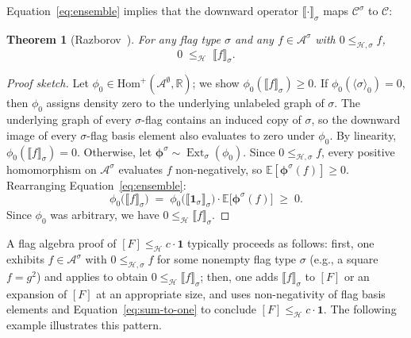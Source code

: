 \documentclass{article}
\newtheorem{theorem}{Theorem}[section]
\newcommand{\poshom}[1]{\mathrm{Hom}^+(\mathcal{A}^{#1}, \mathbb{R})}
\newcommand{\Ext}{\operatorname{Ext}}
\begin{document}
Equation~\eqref{eq:ensemble} implies that the downward operator $\llbracket \cdot \rrbracket_\sigma$ maps $\mathcal{C}^\sigma$ to $\mathcal{C}$:

\begin{theorem}[Razborov~{\cite{razborov2007flag}}]\label{thm:downward-nonneg}
  For any flag type $\sigma$ and any $f \in \mathcal{A}^\sigma$ with $0 \leq_{\mathcal{H},\sigma} f$,
  \[
    0 \;\leq_{\mathcal{H}}\; \llbracket f \rrbracket_\sigma.
  \]
\end{theorem}
\begin{proof}[Proof sketch]
  Let $\phi_0 \in \poshom{\emptyset}$; we show $\phi_0(\llbracket f \rrbracket_\sigma) \geq 0$.
  If $\phi_0(\langle\sigma\rangle_0) = 0$, then $\phi_0$ assigns density zero
  to the underlying unlabeled graph of $\sigma$.  The underlying graph of
  every $\sigma$-flag contains an induced copy of $\sigma$, so the downward
  image of every $\sigma$-flag basis element also evaluates to zero under
  $\phi_0$.  By linearity, $\phi_0(\llbracket f \rrbracket_\sigma) = 0$.
  Otherwise, let $\boldsymbol{\phi}^\sigma \sim \Ext_\sigma(\phi_0)$.
  Since $0 \leq_{\mathcal{H},\sigma} f$, every positive homomorphism on
  $\mathcal{A}^\sigma$ evaluates $f$ non-negatively, so
  $\mathbb{E}[\boldsymbol{\phi}^\sigma(f)] \geq 0$.
  Rearranging Equation~\eqref{eq:ensemble}:
  \[
    \phi_0\bigl(\llbracket f \rrbracket_\sigma\bigr)
    \;=\;
    \phi_0\bigl(\llbracket \mathbf{1}_\sigma \rrbracket_\sigma\bigr)
    \cdot
    \mathbb{E}\bigl[\boldsymbol{\phi}^\sigma(f)\bigr]
    \;\geq\; 0.
  \]
  Since $\phi_0$ was arbitrary, we have $0 \leq_{\mathcal{H}} \llbracket f \rrbracket_\sigma$.
\end{proof}

A flag algebra proof of $[F] \leq_{\mathcal{H}} c\cdot\mathbf{1}$ typically proceeds as follows:
first, one exhibits $f \in \mathcal{A}^\sigma$ with $0 \leq_{\mathcal{H},\sigma} f$ for some
nonempty flag type $\sigma$ (e.g., a square $f = g^2$) and applies
 to obtain $0 \leq_{\mathcal{H}} \llbracket f \rrbracket_\sigma$;
then, one adds $\llbracket f \rrbracket_\sigma$ to $[F]$ or an expansion of $[F]$
at an appropriate size, and uses non-negativity of flag basis elements and
Equation~\eqref{eq:sum-to-one} to conclude $[F] \leq_{\mathcal{H}} c\cdot\mathbf{1}$.
The following example illustrates this pattern.
\end{document}
